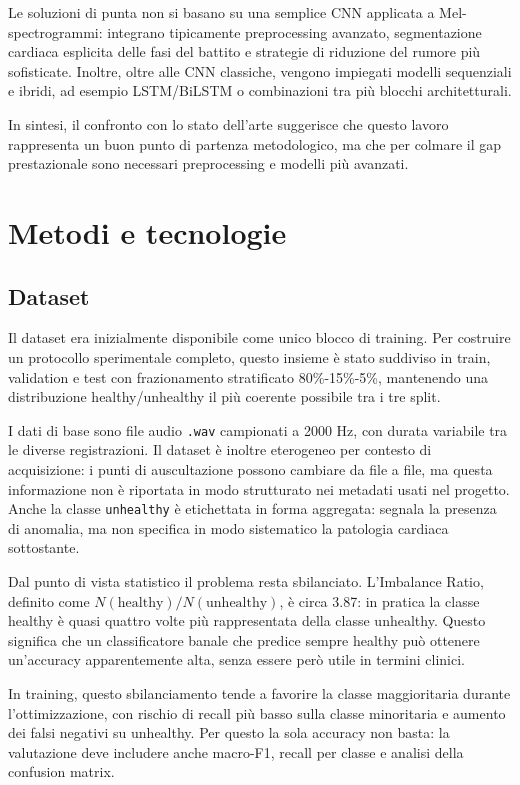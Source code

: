 \documentclass[12pt,a4paper]{article}
\begin{document}
Le soluzioni di punta non si basano su una semplice CNN applicata a Mel-spectrogrammi: integrano
tipicamente preprocessing avanzato, segmentazione cardiaca esplicita delle fasi del battito e
strategie di riduzione del rumore più sofisticate. Inoltre, oltre alle CNN classiche, vengono
impiegati modelli sequenziali e ibridi, ad esempio LSTM/BiLSTM o combinazioni tra più blocchi
architetturali.

In sintesi, il confronto con lo stato dell'arte suggerisce che questo lavoro rappresenta un buon
punto di partenza metodologico, ma che per colmare il gap prestazionale sono necessari
preprocessing e modelli più avanzati.

\section{Metodi e tecnologie}
\subsection{Dataset}
Il dataset era inizialmente disponibile come unico blocco di training. Per costruire un protocollo
sperimentale completo, questo insieme è stato suddiviso in train, validation e test con
frazionamento stratificato 80\%-15\%-5\%, mantenendo una distribuzione healthy/unhealthy il più
coerente possibile tra i tre split.

I dati di base sono file audio \texttt{.wav} campionati a 2000 Hz, con durata variabile tra le
diverse registrazioni. Il dataset è inoltre eterogeneo per contesto di acquisizione: i punti di
auscultazione possono cambiare da file a file, ma questa informazione non è riportata in modo
strutturato nei metadati usati nel progetto. Anche la classe \texttt{unhealthy} è etichettata in
forma aggregata: segnala la presenza di anomalia, ma non specifica in modo sistematico la
patologia cardiaca sottostante.

Dal punto di vista statistico il problema resta sbilanciato. L'Imbalance Ratio, definito come
\(N(\text{healthy}) / N(\text{unhealthy})\), è circa 3.87: in pratica la classe healthy è quasi
quattro volte più rappresentata della classe unhealthy. Questo significa che un classificatore
banale che predice sempre healthy può ottenere un'accuracy apparentemente alta, senza essere però
utile in termini clinici.

In training, questo sbilanciamento tende a favorire la classe maggioritaria durante
l'ottimizzazione, con rischio di recall più basso sulla classe minoritaria e aumento dei falsi
negativi su unhealthy. Per questo la sola accuracy non basta: la valutazione deve includere anche
macro-F1, recall per classe e analisi della confusion matrix.
\end{document}
